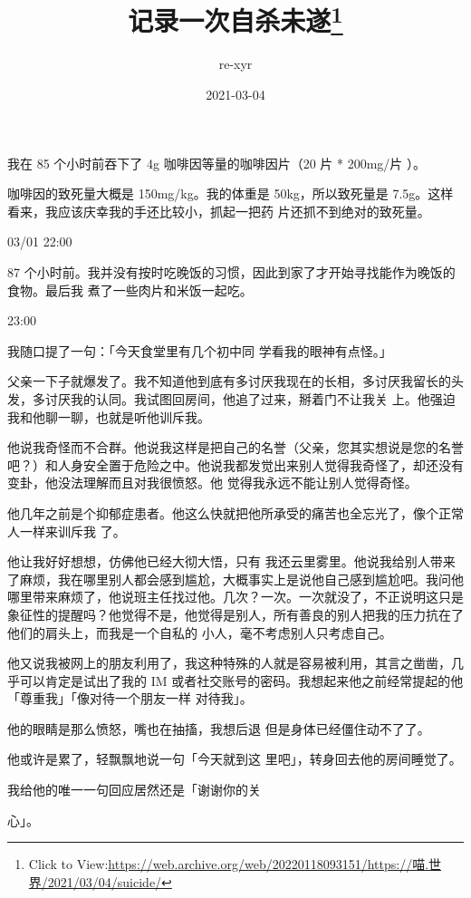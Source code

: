\documentclass{article}
\title{记录一次自杀未遂\footnote{Click to View:\url{https://web.archive.org/web/20220118093151/https://喵.世界/2021/03/04/suicide/}}}
\author{re-xyr}
\date{2021-03-04}
\begin{document}

\maketitle


\Large

﻿我在 85 个小时前吞下了 4g 咖啡因等量的咖啡因片（20 片 * 200mg/片
）。 

咖啡因的致死量大概是 150mg/kg。我的体重是 50kg，所以致死量是 7.5g。这样看来，我应该庆幸我的手还比较小，抓起一把药
片还抓不到绝对的致死量。 


03/01 22:00 

87 个小时前。我并没有按时吃晚饭的习惯，因此到家了才开始寻找能作为晚饭的食物。最后我
煮了一些肉片和米饭一起吃。 

\newpage


23:00 

我随口提了一句：「今天食堂里有几个初中同
学看我的眼神有点怪。」 

父亲一下子就爆发了。我不知道他到底有多讨厌我现在的长相，多讨厌我留长的头发，多讨厌我的认同。我试图回房间，他追了过来，掰着门不让我关
上。他强迫我和他聊一聊，也就是听他训斥我。 

他说我奇怪而不合群。他说我这样是把自己的名誉（父亲，您其实想说是您的名誉吧？）和人身安全置于危险之中。他说我都发觉出来别人觉得我奇怪了，却还没有变卦，他没法理解而且对我很愤怒。他
觉得我永远不能让别人觉得奇怪。 

他几年之前是个抑郁症患者。他这么快就把他所承受的痛苦也全忘光了，像个正常人一样来训斥我
了。 

他让我好好想想，仿佛他已经大彻大悟，只有
\newpage
我还云里雾里。他说我给别人带来了麻烦，我在哪里别人都会感到尴尬，大概事实上是说他自己感到尴尬吧。我问他哪里带来麻烦了，他说班主任找过他。几次？一次。一次就没了，不正说明这只是象征性的提醒吗？他觉得不是，他觉得是别人，所有善良的别人把我的压力抗在了他们的肩头上，而我是一个自私的
小人，毫不考虑别人只考虑自己。 

他又说我被网上的朋友利用了，我这种特殊的人就是容易被利用，其言之凿凿，几乎可以肯定是试出了我的 IM 或者社交账号的密码。我想起来他之前经常提起的他「尊重我」「像对待一个朋友一样
对待我」。 

他的眼睛是那么愤怒，嘴也在抽搐，我想后退
但是身体已经僵住动不了了。 

他或许是累了，轻飘飘地说一句「今天就到这
里吧」，转身回去他的房间睡觉了。 

我给他的唯一一句回应居然还是「谢谢你的关
\newpage

心」。 
\end{document}
